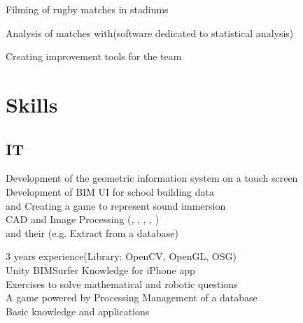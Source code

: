 \documentclass[]{deedy-resume-openfont}
\begin{document}
\begin{minipage}[t]{0.66\textwidth}
\begin{tightemize}
\item Filming of rugby matches in stadiums
\item Analysis of matches with\href{http://www.datastadium.co.jp/service/scrum.html}{}(software dedicated to statistical analysis) 
\item Creating improvement tools for the team %
\end{tightemize}
\sectionsep




\section{Skills}
\subsection{IT}
\textbullet{} \href{https://drive.google.com/open?id=0B6rPLgzEHZsROHV4eUJxNUF6YWc}{} Development of the geometric information system on a touch screen\\ 
\textbullet{} \href{http://bimsurfer.org/}{} Development of BIM UI for school building data\\ 
\textbullet{} \href{https://puredata.info/}{}and Creating a game to represent sound immersion \\
\textbullet{} CAD and Image Processing (, , , , ) \\
\textbullet{}  and their (e.g. Extract from a database) \\
\sectionsep

\textbullet{}  3 years experience(Library: OpenCV, OpenGL, OSG) \\ \textbullet{}   Unity
  \textbullet{}  BIMSurfer \textbullet{}  Knowledge for iPhone app \\
\textbullet{}  Exercises to solve mathematical and robotic questions \\ 
\textbullet{}  A game powered by Processing \textbullet{}  Management of a database \\
\textbullet{}  Basic knowledge and applications \\
\sectionsep


\end{minipage}
\end{document}
